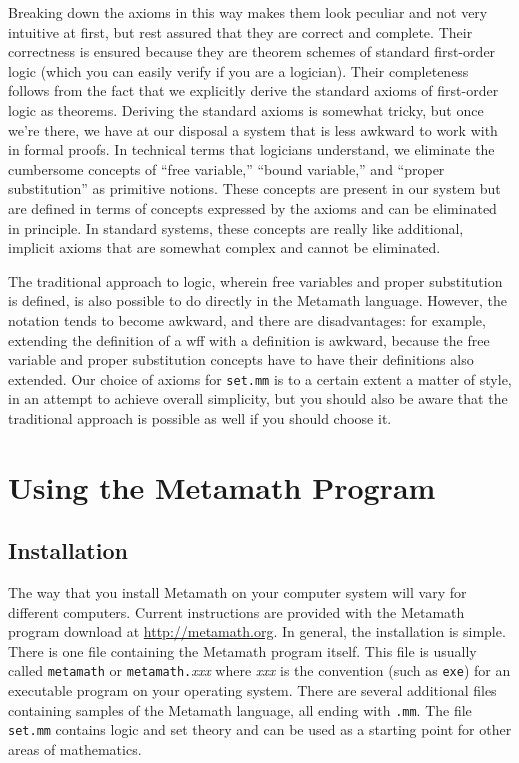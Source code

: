 Breaking down the axioms in this way makes them look peculiar and not very
intuitive at first, but rest assured that they are correct and complete.  Their
correctness is ensured because they are theorem schemes of standard first-order
logic (which you can easily verify if you are a logician).  Their completeness
follows from the fact that we explicitly derive the standard axioms of
first-order logic as theorems.  Deriving the standard axioms is somewhat
tricky, but once we're there, we have at our disposal a system that is less
awkward to work with in formal proofs.  In technical terms
that logicians understand, we eliminate the cumbersome concepts of ``free
variable,'' ``bound variable,'' and
``proper substitution''
as primitive notions.  These concepts are present in our system but are
defined in terms of concepts expressed by the axioms and can be eliminated in
principle.  In standard systems, these concepts are really like additional,
implicit axioms that are somewhat complex and cannot be
eliminated.

The traditional approach to logic, wherein free variables and proper
substitution is defined, is also possible to do directly in the Metamath
language.  However, the notation tends to become awkward, and there are
disadvantages:  for example, extending the definition of a wff with a
definition is awkward, because the free variable and proper substitution
concepts have to have their definitions also extended.  Our choice of
axioms for \texttt{set.mm} is to a certain extent a matter of style, in
an attempt to achieve overall simplicity, but you should also be aware
that the traditional approach is possible as well if you should choose
it.

\chapter{Using the Metamath Program}
\label{using}

\section{Installation}

The way that you install Metamath on your
computer system will vary for different computers.  Current
instructions are provided with the Metamath program download at
\url{http://metamath.org}.  In general, the installation is simple.
There is one file containing the Metamath program itself.  This file is
usually called \texttt{metamath} or \texttt{metamath.}{\em xxx} where
{\em xxx} is the convention (such as \texttt{exe}) for an executable
program on your operating system.  There are several additional files
containing samples of the Metamath language, all ending with
\texttt{.mm}.  The file \texttt{set.mm} contains logic and set theory and can be used as a
starting point for other areas of mathematics.


